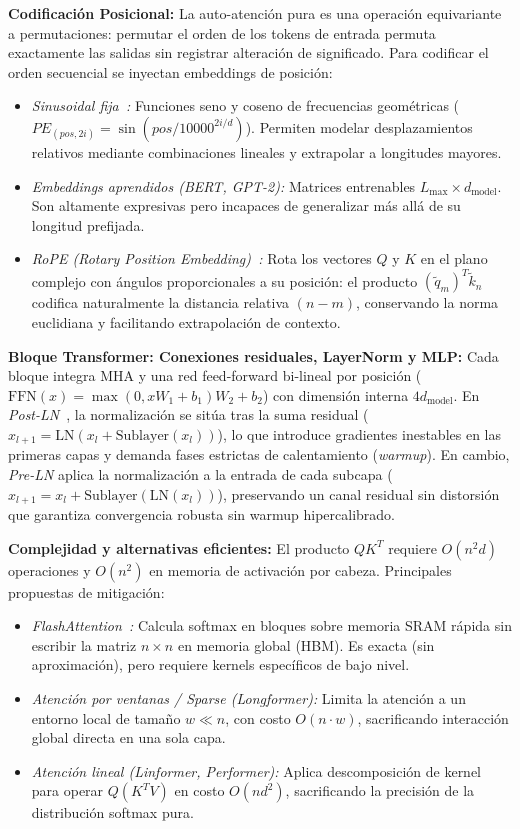 \documentclass[10pt,letterpaper]{article}
\begin{document}
\textbf{Codificación Posicional:}
La auto-atención pura es una operación equivariante a permutaciones: permutar el orden de los tokens de entrada permuta exactamente las salidas sin registrar alteración de significado. Para codificar el orden secuencial se inyectan embeddings de posición:
\begin{itemize}
    \item \textit{Sinusoidal fija~\cite{vaswani2017attention}:} Funciones seno y coseno de frecuencias geométricas ($PE_{(pos, 2i)} = \sin(pos/10000^{2i/d})$). Permiten modelar desplazamientos relativos mediante combinaciones lineales y extrapolar a longitudes mayores.
    \item \textit{Embeddings aprendidos (BERT, GPT-2):} Matrices entrenables $L_{\max} \times d_{\text{model}}$. Son altamente expresivas pero incapaces de generalizar más allá de su longitud prefijada.
    \item \textit{RoPE (Rotary Position Embedding)~\cite{su2024roformer}:} Rota los vectores $Q$ y $K$ en el plano complejo con ángulos proporcionales a su posición: el producto $(\tilde{q}_m)^T \tilde{k}_n$ codifica naturalmente la distancia relativa $(n-m)$, conservando la norma euclidiana y facilitando extrapolación de contexto.
\end{itemize}

\textbf{Bloque Transformer: Conexiones residuales, LayerNorm y MLP:}
Cada bloque integra MHA y una red feed-forward bi-lineal por posición ($\mathrm{FFN}(x) = \max(0, x W_1 + b_1) W_2 + b_2$) con dimensión interna $4 d_{\text{model}}$. En \textit{Post-LN}~\cite{vaswani2017attention}, la normalización se sitúa tras la suma residual ($x_{l+1} = \mathrm{LN}(x_l + \mathrm{Sublayer}(x_l))$), lo que introduce gradientes inestables en las primeras capas y demanda fases estrictas de calentamiento (\textit{warmup}). En cambio, \textit{Pre-LN} aplica la normalización a la entrada de cada subcapa ($x_{l+1} = x_l + \mathrm{Sublayer}(\mathrm{LN}(x_l))$), preservando un canal residual sin distorsión que garantiza convergencia robusta sin warmup hipercalibrado.

\textbf{Complejidad y alternativas eficientes:}
El producto $QK^T$ requiere $O(n^2 d)$ operaciones y $O(n^2)$ en memoria de activación por cabeza. Principales propuestas de mitigación:
\begin{itemize}
    \item \textit{FlashAttention~\cite{dao2022flashattention}:} Calcula softmax en bloques sobre memoria SRAM rápida sin escribir la matriz $n \times n$ en memoria global (HBM). Es exacta (sin aproximación), pero requiere kernels específicos de bajo nivel.
    \item \textit{Atención por ventanas / Sparse (Longformer):} Limita la atención a un entorno local de tamaño $w \ll n$, con costo $O(n \cdot w)$, sacrificando interacción global directa en una sola capa.
    \item \textit{Atención lineal (Linformer, Performer):} Aplica descomposición de kernel para operar $Q(K^T V)$ en costo $O(n d^2)$, sacrificando la precisión de la distribución softmax pura.
\end{itemize}
\end{document}
